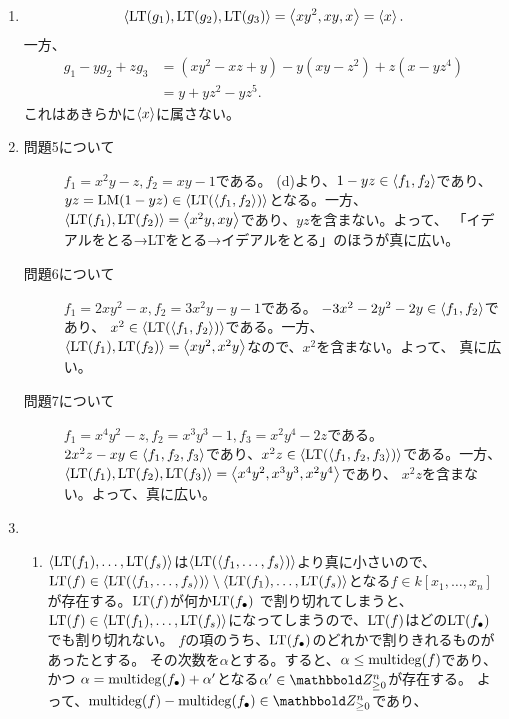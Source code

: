 \begin{enumerate}[label=(問題\arabic*)]
  \item
\begin{align}
  \left\langle {\rm LT}(g_1),{\rm LT}(g_2),{\rm LT}(g_3) \right\rangle = \left\langle xy^2,xy,x \right\rangle = \left\langle x \right\rangle.
\end{align}
一方、
\begin{align}
  g_1 - yg_2 +zg_3
  &=
  (xy^2-xz+y) - y(xy-z^2) +z(x-yz^4)\\
  &=
  y+yz^2 -yz^5.
\end{align}
これはあきらかに$\left\langle x \right\rangle$に属さない。
  \item
  \begin{description}
    \item[問題5について] $f_1=x^2y-z,f_2=xy-1$である。
    (d)より、$1-yz \in \left\langle f_1,f_2 \right\rangle$であり、
    $yz = {\rm LM}(1-yz) \in \left\langle {\rm LT}(\left\langle f_1,f_2 \right\rangle) \right\rangle$となる。一方、
    $\left\langle {\rm LT}(f_1),{\rm LT}(f_2) \right\rangle = \left\langle x^2y,xy \right\rangle$であり、$yz$を含まない。よって、
    「イデアルをとる→LTをとる→イデアルをとる」のほうが真に広い。
    \item[問題6について] $f_1=2xy^2-x,f_2=3x^2y-y-1$である。
    $-3x^2-2y^2-2y \in \left\langle f_1,f_2 \right\rangle$であり、
    $x^2 \in \left\langle {\rm LT}(\left\langle f_1,f_2 \right\rangle) \right\rangle$である。一方、
    $\left\langle {\rm LT}(f_1),{\rm LT}(f_2) \right\rangle = \left\langle xy^2,x^2y \right\rangle$なので、$x^2$を含まない。よって、
    真に広い。
    \item[問題7について] $f_1=x^4y^2-z,f_2=x^3y^3-1,f_3=x^2y^4-2z$である。
    $2x^2z-xy \in \left\langle f_1,f_2,f_3 \right\rangle$であり、$x^2z \in \left\langle {\rm LT}(\left\langle f_1,f_2,f_3 \right\rangle) \right\rangle$である。一方、
    $\left\langle {\rm LT}(f_1),{\rm LT}(f_2),{\rm LT}(f_3) \right\rangle = \left\langle x^4y^2,x^3y^3,x^2y^4 \right\rangle$であり、
    $x^2z$を含まない。よって、真に広い。
  \end{description}
  \item
  \begin{enumerate}[label=(\alph*)]
    \item
  $\left\langle {\rm LT}(f_1),\dots,{\rm LT}(f_s) \right\rangle$は$\left\langle {\rm LT}(\left\langle f_1,\dots,f_s \right\rangle) \right\rangle$より真に小さいので、${\rm LT}(f)\in \left\langle {\rm LT}(\left\langle f_1,\dots,f_s \right\rangle) \right\rangle\setminus\left\langle {\rm LT}(f_1),\dots,{\rm LT}(f_s) \right\rangle$となる$f \in k[x_1,\dots,x_n]$が存在する。${\rm LT}(f)$が何か${\rm LT}(f_\bullet)$
  で割り切れてしまうと、${\rm LT}(f) \in \left\langle {\rm LT}(f_1),\dots,{\rm LT}(f_s) \right\rangle$になってしまうので、${\rm LT}(f)$はどの${\rm LT}(f_\bullet)$でも割り切れない。
  $f$の項のうち、${\rm LT}(f_\bullet)$のどれかで割りきれるものがあったとする。
  その次数を$\alpha$とする。すると、$\alpha \le \mathrm{multideg}(f)$であり、かつ
  $\alpha = \mathrm{multideg}(f_\bullet) + \alpha'$となる$\alpha' \in \Zge^n$が存在する。
よって、$\multideg(f)-\multideg(f_\bullet)\in \Zge^n$であり、
\begin{align}

\end{align}
\end{enumerate}
\end{enumerate}
